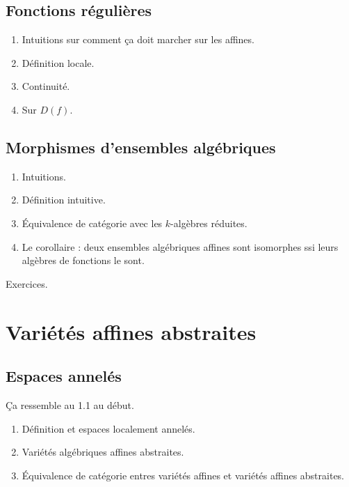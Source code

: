 \documentclass[a4paper,12pt]{book}
\theoremstyle{plain}
\theoremstyle{definition}
\theoremstyle{remark}
\begin{document}
\subsection{Fonctions régulières}
\begin{enumerate}
    \item Intuitions sur comment ça doit marcher sur les affines.
    \item Définition locale.
    \item Continuité.
    \item Sur $D(f)$.
\end{enumerate}
\subsection{Morphismes d'ensembles algébriques}
\begin{enumerate}
    \item Intuitions.
    \item Définition intuitive.
    \item Équivalence de catégorie avec les $k$-algèbres réduites.
    \item Le corollaire : deux ensembles algébriques affines sont 
	isomorphes ssi leurs algèbres de fonctions le sont.
\end{enumerate}
Exercices.

\section{Variétés affines abstraites}
\subsection{Espaces annelés}
Ça ressemble au 1.1 au début.
\begin{enumerate}
    \item Définition et espaces localement annelés.
    \item Variétés algébriques affines abstraites.
    \item Équivalence de catégorie entres variétés affines et variétés
	affines abstraites.
\end{enumerate}



\printbibliography
\end{document}
